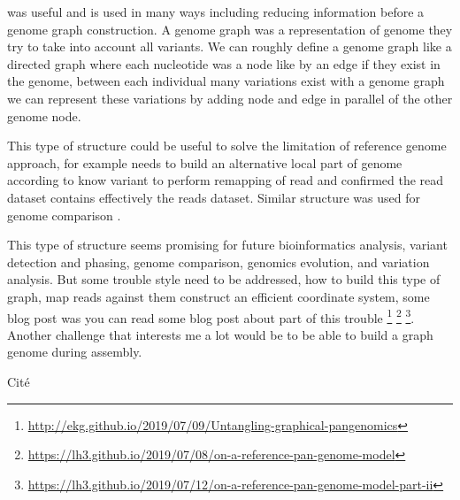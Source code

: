 \documentclass[main.tex]{subfiles}
\begin{document}
\bigskip

\fpa was useful and is used in many ways including reducing information before a genome graph construction. A genome graph was a representation of genome they try to take into account all variants. We can roughly define a genome graph like a directed graph where each nucleotide was a node like by an edge if they exist in the genome, between each individual many variations exist with a genome graph we can represent these variations by adding node and edge in parallel of the other genome node.

This type of structure could be useful to solve the limitation of reference genome approach, for example  \cite{whatshap} needs to build an alternative local part of genome according to know variant to perform remapping of read and confirmed the read dataset contains effectively the reads dataset. Similar structure was used for genome comparison  \cite{cactus_graph}.

This type of structure seems promising for future bioinformatics analysis, variant detection and phasing, genome comparison,  genomics evolution, and variation analysis. But some trouble style need to be addressed, how to build this type of graph, map reads against them construct an efficient coordinate system, some blog post was you can read some blog post about part of this trouble \footnote{\url{http://ekg.github.io/2019/07/09/Untangling-graphical-pangenomics}} \footnote{\url{https://lh3.github.io/2019/07/08/on-a-reference-pan-genome-model}} \footnote{\url{https://lh3.github.io/2019/07/12/on-a-reference-pan-genome-model-part-ii}}. Another challenge that interests me a lot would be to be able to build a graph genome during assembly.


Cité \cite{goodbye_ref_hello_graphs}




\end{document}
